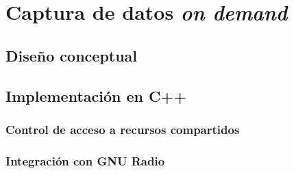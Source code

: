 \documentclass[../../main.tex]{subfiles}
\begin{document}
\graphicspath{{./figures}}
\chapter{Captura de datos \textit{on demand}}

\section{Diseño conceptual}

\section{Implementación en C++}
\subsection{Control de acceso a recursos compartidos}
\subsection{Integración con GNU Radio}
\end{document}
